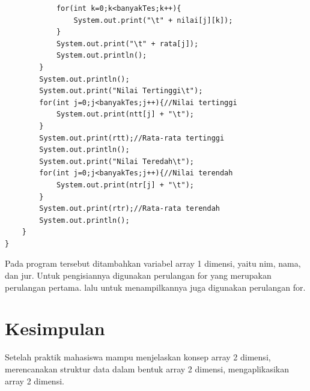 \documentclass[a4paper,12pt]{article}
\begin{document}
\begin{lstlisting}
            for(int k=0;k<banyakTes;k++){
                System.out.print("\t" + nilai[j][k]);
            }
            System.out.print("\t" + rata[j]);
            System.out.println();
        }
        System.out.println();
        System.out.print("Nilai Tertinggi\t");
        for(int j=0;j<banyakTes;j++){//Nilai tertinggi
            System.out.print(ntt[j] + "\t");
        }
        System.out.print(rtt);//Rata-rata tertinggi
        System.out.println();
        System.out.print("Nilai Teredah\t");
        for(int j=0;j<banyakTes;j++){//Nilai terendah
            System.out.print(ntr[j] + "\t");
        }
        System.out.print(rtr);//Rata-rata terendah
        System.out.println();
    }
}
\end{lstlisting}
Pada program tersebut ditambahkan variabel array 1 dimensi, yaitu nim, nama, dan jur. Untuk pengisiannya digunakan perulangan for yang merupakan perulangan pertama.
lalu untuk menampilkannya juga digunakan perulangan for.

\section{Kesimpulan}
Setelah praktik mahasiswa mampu menjelaskan konsep array 2 dimensi, merencanakan struktur data dalam bentuk array 2 dimensi, mengaplikasikan array 2 dimensi.
\end{document}
